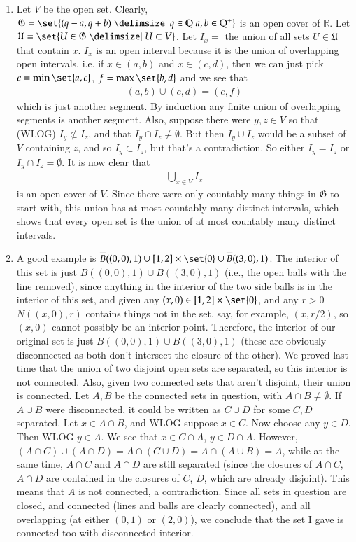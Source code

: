 \documentclass[12pt]{article}
\def\mbb#1{\mathbb{#1}}
\def \R{\mbb{R}}
\def\bQ{\mbb{Q}}
\theoremstyle{definition}
\theoremstyle{remark}
\begin{document}
\begin{enumerate}[leftmargin=\labelsep]
		\item Let $V$ be the open set. Clearly, $\mathfrak{G} = \set{(q-a, q+b) \given q \in \bQ \; a, b \in \bQ^+}$ is an open cover of $\R$. Let $\mathfrak{U}=\set{U \in \mathfrak{G} \given U \subset V}$. Let $I_x = $ the union of all sets $U \in \mathfrak{U}$ that contain $x$. $I_x$ is an open interval because it is the union of overlapping open intervals, i.e. if $x \in (a, b)$ and $x \in (c, d)$, then we can just pick $e = \min \set{a, c}$, $f = \max \set{b, d}$ and we see that
		\begin{align*}
			(a, b) \cup (c, d) = (e, f)
		\end{align*}
		which is just another segment. By induction any finite union of overlapping segments is another segment. Also, suppose there were $y, z \in V$ so that (WLOG) $I_y \not \subset I_z$, and that $I_y \cap I_z \not = \emptyset$. But then $I_y \cup I_z$ would be a subset of $V$ containing $z$, and so $I_y \subset I_z$, but that's a contradiction. So either $I_y = I_z$ or $I_y \cap I_z = \emptyset$. It is now clear that
		\begin{align*}
			\bigcup_{x \in V} I_x
		\end{align*}
		is an open cover of $V$. Since there were only countably many things in $\mathfrak{G}$ to start with, this union has at most countably many distinct intervals, which shows that every open set is the union of at most countably many distinct intervals.
	
		\item A good example is $\overline{B}((0, 0), 1) \cup [1, 2] \times \set{0} \cup \overline{B}((3, 0), 1)$. The interior of this set is just $B((0, 0), 1) \cup B((3, 0), 1)$ (i.e., the open balls with the line removed), since anything in the interior of the two side balls is in the interior of this set, and given any $(x, 0) \in [1, 2] \times \set{0}$, and any $r > 0$ $N((x, 0), r)$ contains things not in the set, say, for example, $(x, r/2)$, so $(x, 0)$ cannot possibly be an interior point. Therefore, the interior of our original set is just $B((0, 0), 1) \cup B((3, 0), 1)$ (these are obviously disconnected as both don't intersect the closure of the other). We proved last time that the union of two disjoint open sets are separated, so this interior is not connected. Also, given two connected sets that aren't disjoint, their union is connected. Let $A, B$ be the connected sets in question, with $A \cap B \neq \emptyset$. If $A\cup B$ were disconnected, it could be written as $C \cup D$ for some $C, D$ separated. Let $x \in A \cap B$, and WLOG suppose $x \in C$. Now choose any $y \in D$. Then WLOG $y \in A$. We see that $x \in C \cap A$, $y \in D \cap A$. However, $(A \cap C) \cup (A \cap D) = A \cap (C \cup D) = A \cap (A \cup B) = A$, while at the same time, $A \cap C$ and $A \cap D$ are still separated (since the closures of $A \cap C$, $A \cap D$ are contained in the closures of $C$, $D$, which are already disjoint). This means that $A$ is not connected, a contradiction. Since all sets in question are closed, and connected (lines and balls are clearly connected), and all overlapping (at either $(0, 1)$ or $(2, 0)$), we conclude that the set I gave is connected too with disconnected interior.
		

\end{enumerate}
\end{document}
